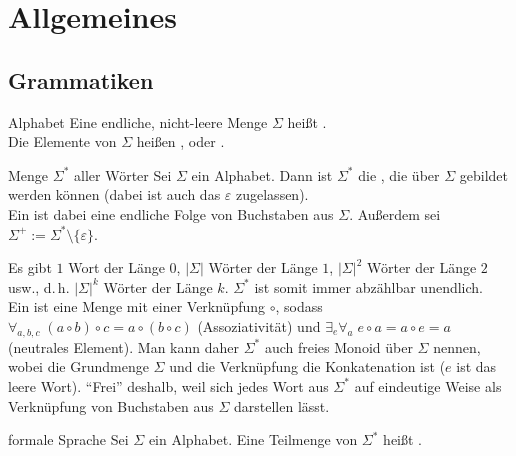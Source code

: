\chapter{%
    Allgemeines%
}

\section{%
    Grammatiken%
}

\begin{Def}{Alphabet}
    Eine endliche, nicht-leere Menge $\Sigma$ heißt .\\
    Die Elemente von $\Sigma$ heißen ,
     oder .
\end{Def}

\begin{Def}{Menge $\Sigma^\ast$ aller Wörter}
    Sei $\Sigma$ ein Alphabet.
    Dann ist $\Sigma^\ast$ die ,
    die über $\Sigma$ gebildet werden können
    (dabei ist auch das  $\varepsilon$ zugelassen).\\
    Ein  ist dabei eine endliche Folge von
    Buchstaben aus $\Sigma$.
    Außerdem sei $\Sigma^+ := \Sigma^\ast \setminus \{\varepsilon\}$.
\end{Def}

\begin{Bem}
    Es gibt $1$ Wort der Länge $0$, $|\Sigma|$ Wörter der Länge $1$,
    $|\Sigma|^2$ Wörter der Länge $2$ usw., d.\,h.
    $|\Sigma|^k$ Wörter der Länge $k$.
    $\Sigma^\ast$ ist somit immer abzählbar unendlich.\\
    Ein  ist eine Menge mit einer Verknüpfung $\circ$, sodass
    $\forall_{a, b, c}\; (a \circ b) \circ c = a \circ (b \circ c)$
    (Assoziativität) und $\exists_{e} \forall_{a}\; e \circ a = a \circ e = a$
    (neutrales Element).
    Man kann daher $\Sigma^\ast$ auch freies Monoid über $\Sigma$ nennen,
    wobei die Grundmenge $\Sigma$ und die Verknüpfung die Konkatenation ist
    ($e$ ist das leere Wort).
    "`Frei"' deshalb, weil sich jedes Wort aus $\Sigma^\ast$ auf eindeutige
    Weise als Verknüpfung von Buchstaben aus $\Sigma$ darstellen lässt.
\end{Bem}

\begin{Def}{formale Sprache}
    Sei $\Sigma$ ein Alphabet.
    Eine Teilmenge von $\Sigma^\ast$ heißt .
\end{Def}

